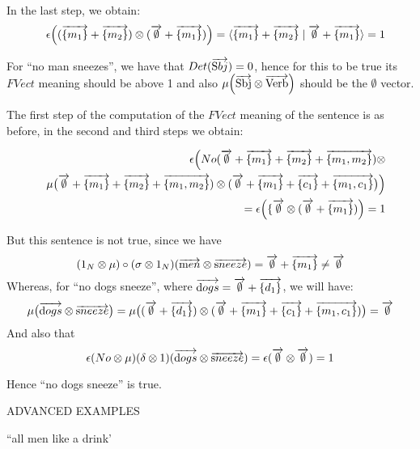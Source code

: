 \noindent
In the last step, we obtain:
\begin{eqnarray*}
&& \epsilon \Big((\overrightarrow{\{m_1\}} + \overrightarrow{\{m_2\}}) \otimes (\overrightarrow{\emptyset }+ \overrightarrow{\{m_1\}})\Big) = \langle \overrightarrow{\{m_1\}} + \overrightarrow{\{m_2\}}  \mid \overrightarrow{\emptyset} + \overrightarrow{\{m_1\}} \rangle =  1
\end{eqnarray*}


\noindent
For ``no man sneezes'', we have that $Det(\overrightarrow{\text Sbj}) = 0$, hence for this to be true its $FVect$ meaning should be above 1 and also $\mu \Big(\overrightarrow{\text{Sbj}} \otimes \overrightarrow{\text{Verb}} \Big)$ should be the $\emptyset$ vector. 

The first step of the computation  of the $FVect$ meaning of the sentence is as before, in the second and third steps we obtain:

\begin{eqnarray*}
&&\epsilon \Big (No (\overrightarrow{\emptyset} + \overrightarrow{\{m_1\}} + \overrightarrow{\{m_2\}} + \overrightarrow{\{m_1, m_2\}}) \otimes \\
&& \mu\big(\overrightarrow{\emptyset}  + \overrightarrow{\{m_1\}} + \overrightarrow{\{m_2\}}  + \overrightarrow{\{m_1, m_2\}}) \otimes (\overrightarrow{\emptyset} + \overrightarrow{\{m_1\}} + \overrightarrow{\{c_1\}} + \overrightarrow{\{m_1, c_1\}}\big)\Big)\\
&&= 
\epsilon \Big(\{\overrightarrow{\emptyset} \otimes (\overrightarrow{\emptyset} + \overrightarrow{\{m_1\}}) \Big) = 1
\end{eqnarray*}

\noindent
But this sentence is not true, since we have 
\[
(1_N \otimes \mu) \circ (\sigma \otimes 1_N)(\overrightarrow{\text men} \otimes \overrightarrow{\text sneeze})   = 
\overrightarrow{\emptyset} + \overrightarrow{\{m_1\}} \neq \overrightarrow{\emptyset}
\]
Whereas, for  ``no dogs sneeze'', where $\overrightarrow{\text dogs} = \overrightarrow{\emptyset} + \overrightarrow{\{d_1\}}$, we will have:
\[
\mu\big(\overrightarrow{\text dogs} \otimes \overrightarrow{\text sneeze}\big) = \mu \big((\overrightarrow{\emptyset} + \overrightarrow{\{d_1\}}) \otimes (\overrightarrow{\emptyset} + \overrightarrow{\{m_1\}} + \overrightarrow{\{c_1\}} + \overrightarrow{\{m_1, c_1\}})\big) = \overrightarrow{\emptyset}
\]
And also that 
\[\epsilon(No \otimes \mu) (\delta \otimes 1)(\overrightarrow{\text dogs} \otimes \overrightarrow{\text sneeze}) =
\epsilon(\overrightarrow{\emptyset} \otimes \overrightarrow{\emptyset}) = 1
\]

\noindent
Hence ``no dogs sneeze'' is true.

ADVANCED EXAMPLES 

``all men like a drink'


